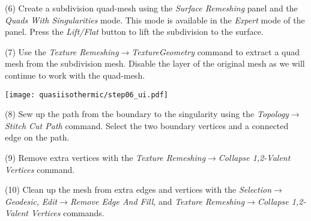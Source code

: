 \documentclass[Thesis.tex]{subfiles}
\begin{document}
\begin{compactenum}[(1)]
\begin{center}
\begin{minipage}{\linewidth}
            \centering
\end{minipage}
\end{center}     
            
\item[(6)] Create a subdivision quad-mesh using the \emph{Surface Remeshing} panel and the \emph{Quads With Singularities} mode. This mode is available in the \emph{Expert} mode of the panel. Press the \emph{Lift/Flat} button to lift the subdivision to the surface.
\item[(7)] Use the \emph{Texture Remeshing$\to$TextureGeometry} command to extract a quad mesh from the subdivision mesh. Disable the layer of the original mesh as we will continue to work with the quad-mesh.

\begin{center}
\begin{minipage}{0.75\linewidth}
            \centering
            \label{fig:three-step-remeshing}
\end{minipage}
\begin{minipage}{0.24\linewidth}
\texttt{[image: quasiisothermic/step06\_ui.pdf]}
\end{minipage}
\end{center}                 
            
\item[(8)] Sew up the path from the boundary to the singularity using the \emph{Topology$\to$ Stitch Cut Path} command. Select the two boundary vertices and a connected edge on the path.
\item[(9)] Remove extra vertices with the \emph{Texture Remeshing$\to$Collapse 1,2-Valent Vertices} command.
\item[(10)] Clean up the mesh from extra edges and vertices with the \emph{Selection$\to$Geodesic}, \emph{Edit$\to$Remove Edge And Fill}, and \emph{Texture Remeshing$\to$Collapse 1,2-Valent Vertices} commands.


\end{compactenum}
\end{document}
